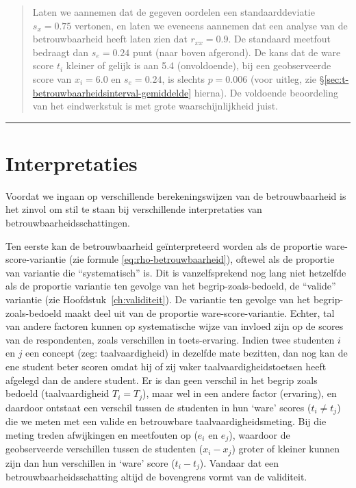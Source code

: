 \documentclass[
]{book}
\begin{document}
\begin{quote}
Laten we aannemen dat de gegeven oordelen een standaarddeviatie
\(s_x=0.75\) vertonen, en laten we eveneens aannemen dat een analyse van
de betrouwbaarheid heeft laten zien dat \(r_{xx}=0.9\). De standaard
meetfout bedraagt dan \(s_e = 0.24\) punt (naar boven afgerond). De kans
dat de ware score \(t_i\) kleiner of gelijk is aan 5.4 (onvoldoende), bij
een geobserveerde score van \(x_i=6.0\) en \(s_e=0.24\), is slechts \(p=0.006\)
(voor uitleg, zie §\ref{sec:t-betrouwbaarheidsinterval-gemiddelde} hierna).
De voldoende beoordeling van het eindwerkstuk is met grote
waarschijnlijkheid juist.
\end{quote}

\begin{center}\rule{0.5\linewidth}{0.5pt}\end{center}

\hypertarget{interpretaties}{%
\section{Interpretaties}\label{interpretaties}}

Voordat we ingaan op verschillende berekeningswijzen van de
betrouwbaarheid is het zinvol om stil te staan bij verschillende
interpretaties van betrouwbaarheidsschattingen.

Ten eerste kan de betrouwbaarheid geïnterpreteerd worden als de
proportie ware-score-variantie (zie formule \eqref{eq:rho-betrouwbaarheid}),
oftewel als de proportie van
variantie die ``systematisch'' is. Dit is vanzelfsprekend nog lang niet
hetzelfde als de proportie variantie ten gevolge van het
begrip-zoals-bedoeld, de ``valide'' variantie (zie
Hoofdstuk~\ref{ch:validiteit}). De variantie ten gevolge van het
begrip-zoals-bedoeld maakt deel uit van de proportie
ware-score-variantie. Echter, tal van andere factoren kunnen op
systematische wijze van invloed zijn op de scores van de respondenten,
zoals verschillen in toets-ervaring. Indien twee studenten \(i\) en \(j\)
een concept (zeg: taalvaardigheid) in dezelfde mate bezitten, dan nog
kan de ene student beter scoren omdat hij of zij vaker
taalvaardigheidstoetsen heeft afgelegd dan de andere student. Er is dan
geen verschil in het begrip zoals bedoeld (taalvaardigheid \(T_i = T_j\)),
maar wel in een andere factor (ervaring), en daardoor ontstaat een
verschil tussen de studenten in hun `ware' scores (\(t_i \neq t_j\)) die
we meten met een valide en betrouwbare taalvaardigheidsmeting. Bij die
meting treden afwijkingen en meetfouten op (\(e_i\) en \(e_j\)), waardoor de
geobserveerde verschillen tussen de studenten (\(x_i-x_j\)) groter of
kleiner kunnen zijn dan hun verschillen in `ware' score (\(t_i-t_j\)).
Vandaar dat een betrouwbaarheidsschatting altijd de bovengrens vormt van
de validiteit.
\end{document}

